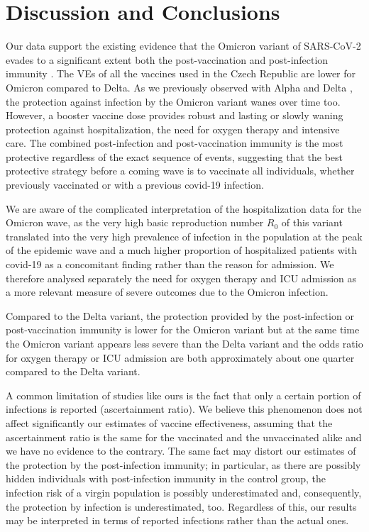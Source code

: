 \documentclass[9pt,twocolumn,twoside,lineno]{pnas-new}
\begin{document}
\section*{Discussion and Conclusions}
\label{sec4}

Our data support the existing evidence that the Omicron variant of SARS-CoV-2 evades to a significant extent both the post-vaccination and post-infection immunity \citep{mccallum2022,Dejnirattisai2022,Hoffmann2022,Cui2022,Cao2021}. The VEs of all the vaccines used in the Czech Republic are lower for Omicron compared to Delta. As we previously observed with Alpha and Delta \citep{Berec2021preprint}, the protection against infection by the Omicron variant wanes over time too. However, a booster vaccine dose provides robust and lasting or slowly waning protection against hospitalization, the need for oxygen therapy and intensive care. The combined post-infection and post-vaccination immunity is the most protective regardless of the exact sequence of events, suggesting that the best protective strategy before a coming wave is to vaccinate all individuals, whether previously vaccinated or with a previous covid-19 infection.

We are aware of the complicated interpretation of the hospitalization data for the Omicron wave, as the very high basic reproduction number $R_0$ of this variant \cite{nishiura2022relative} translated into the very high prevalence of infection in the population at the peak of the epidemic wave and a much higher proportion of hospitalized patients with covid-19 as a concomitant finding rather than the reason for admission. We therefore analysed separately the need for oxygen therapy and ICU admission as a more relevant measure of severe outcomes due to the Omicron infection.

Compared to the Delta variant, the protection provided by the post-infection or post-vaccination immunity is lower for the Omicron variant but at the same time the Omicron variant appears less severe than the Delta variant and the odds ratio for oxygen therapy or ICU admission are both approximately about one quarter compared to the Delta variant.

A common limitation of studies like ours is the fact that only a certain portion of infections is reported (ascertainment ratio).  We believe this phenomenon does not affect significantly our estimates of vaccine effectiveness, assuming that the ascertainment ratio is the same for the vaccinated and the unvaccinated alike and we have no evidence to the contrary. The same fact may distort our estimates of the protection by the post-infection immunity; in particular, as there are possibly hidden individuals with post-infection immunity in the control group, the infection risk of a virgin population is possibly underestimated and, consequently, the protection by infection is underestimated, too. Regardless of this, our results may be interpreted in terms of reported infections rather than the actual ones. 
\end{document}
